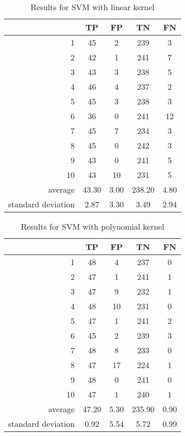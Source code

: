 \documentclass[12pt]{article}
\begin{document}
  \begin{table}[H]
    \centering
    \caption{Results for SVM with linear kernel}
    \vspace{0.25cm}
    \label{tab:linearSVM}
    \begin{tabular}{r|c|c|c|c}
      &TP&FP&TN&FN\\
      \hline
      1&45&2&239&3\\
      2&42&1&241&7\\
      3&43&3&238&5\\
      4&46&4&237&2\\
      5&45&3&238&3\\
      6&36&0&241&12\\
      7&45&7&234&3\\
      8&45&0&242&3\\
      9&43&0&241&5\\
      10&43&10&231&5\\
      \hline
      average&43.30&3.00&238.20&4.80\\
      standard deviation&2.87&3.30&3.49&2.94
    \end{tabular}
  \end{table}

  \begin{table}[H]
    \centering
    \caption{Results for SVM with polynomial kernel}
    \vspace{0.25cm}
    \label{tab:polySVM}
    \begin{tabular}{r|c|c|c|c}
      &TP&FP&TN&FN\\
      \hline
      1&48&4&237&0\\
      2&47&1&241&1\\
      3&47&9&232&1\\
      4&48&10&231&0\\
      5&47&1&241&2\\
      6&45&2&239&3\\
      7&48&8&233&0\\
      8&47&17&224&1\\
      9&48&0&241&0\\
      10&47&1&240&1\\
      \hline
      average&47.20&5.30&235.90&0.90\\
      standard deviation&0.92&5.54&5.72&0.99
    \end{tabular}
  \end{table}
\end{document}
